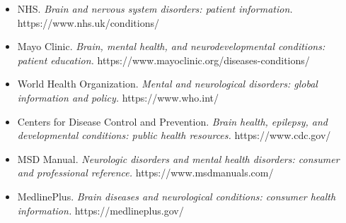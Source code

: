 \begin{itemize}
    \item NHS. \textit{Brain and nervous system disorders: patient information.} https://www.nhs.uk/conditions/
    \item Mayo Clinic. \textit{Brain, mental health, and neurodevelopmental conditions: patient education.} https://www.mayoclinic.org/diseases-conditions/
    \item World Health Organization. \textit{Mental and neurological disorders: global information and policy.} https://www.who.int/
    \item Centers for Disease Control and Prevention. \textit{Brain health, epilepsy, and developmental conditions: public health resources.} https://www.cdc.gov/
    \item MSD Manual. \textit{Neurologic disorders and mental health disorders: consumer and professional reference.} https://www.msdmanuals.com/
    \item MedlinePlus. \textit{Brain diseases and neurological conditions: consumer health information.} https://medlineplus.gov/
\end{itemize}
